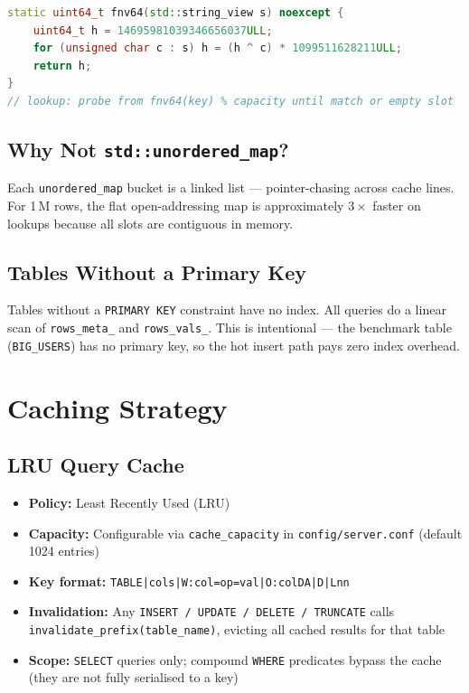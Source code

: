 \documentclass[12pt,a4paper]{article}
\begin{document}
\begin{lstlisting}[language=C++,title={FNV-64 hash + probe loop}]
static uint64_t fnv64(std::string_view s) noexcept {
    uint64_t h = 14695981039346656037ULL;
    for (unsigned char c : s) h = (h ^ c) * 1099511628211ULL;
    return h;
}
// lookup: probe from fnv64(key) % capacity until match or empty slot
\end{lstlisting}

\subsection{Why Not \texttt{std::unordered\_map}?}

Each \texttt{unordered\_map} bucket is a linked list — pointer-chasing across cache lines.
For 1\,M rows, the flat open-addressing map is approximately $3\times$ faster on lookups
because all slots are contiguous in memory.

\subsection{Tables Without a Primary Key}

Tables without a \texttt{PRIMARY KEY} constraint have no index. All queries do a linear
scan of \texttt{rows\_meta\_} and \texttt{rows\_vals\_}. This is intentional — the
benchmark table (\texttt{BIG\_USERS}) has no primary key, so the hot insert path pays
zero index overhead.

\section{Caching Strategy}

\subsection{LRU Query Cache}

\begin{itemize}[noitemsep]
  \item \textbf{Policy:} Least Recently Used (LRU)
  \item \textbf{Capacity:} Configurable via \texttt{cache\_capacity} in \texttt{config/server.conf}
        (default 1024 entries)
  \item \textbf{Key format:} \texttt{TABLE|cols|W:col=op=val|O:colDA|D|Lnn}
  \item \textbf{Invalidation:} Any \texttt{INSERT / UPDATE / DELETE / TRUNCATE} calls
        \texttt{invalidate\_prefix(table\_name)}, evicting all cached results for that table
  \item \textbf{Scope:} \texttt{SELECT} queries only; compound \texttt{WHERE} predicates bypass
        the cache (they are not fully serialised to a key)
\end{itemize}
\end{document}

